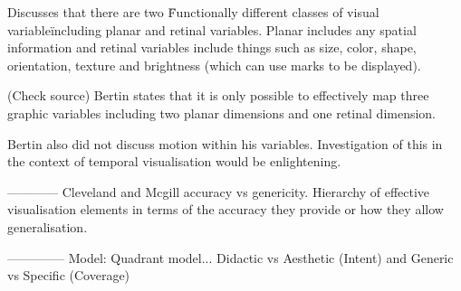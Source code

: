Discusses that there are two \"Functionally different classes of visual variable\" including planar and retinal variables. Planar includes any spatial information and retinal variables include things such as size, color, shape, orientation, texture and brightness (which can use marks to be displayed).

(Check source) Bertin states that it is only possible to effectively map three graphic variables including two planar dimensions and one retinal dimension.

Bertin also did not discuss motion within his variables. Investigation of this in the context of temporal visualisation would be enlightening.

------------
Cleveland and Mcgill accuracy vs genericity. Hierarchy of effective visualisation elements in terms of the accuracy they provide or how they allow generalisation.

--------------
Model:
Quadrant model...
Didactic vs Aesthetic (Intent) and Generic vs Specific (Coverage)


